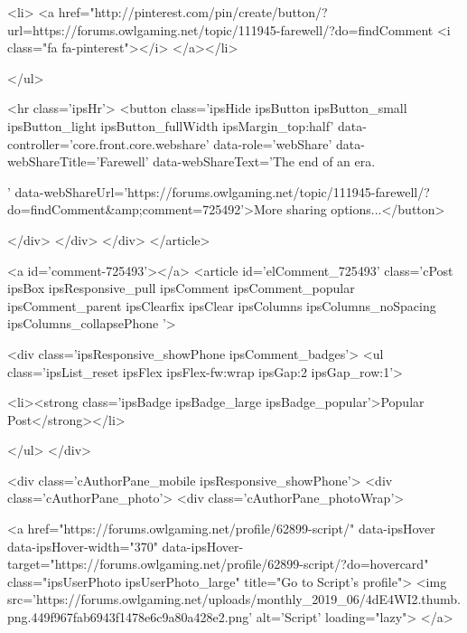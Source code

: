 			<li>
<a href="http://pinterest.com/pin/create/button/?url=https://forums.owlgaming.net/topic/111945-farewell/?do=findComment%
	<i class="fa fa-pinterest"></i>
</a></li>
		
	</ul>


	<hr class='ipsHr'>
	<button class='ipsHide ipsButton ipsButton_small ipsButton_light ipsButton_fullWidth ipsMargin_top:half' data-controller='core.front.core.webshare' data-role='webShare' data-webShareTitle='Farewell' data-webShareText='The end of an era. 
 
' data-webShareUrl='https://forums.owlgaming.net/topic/111945-farewell/?do=findComment&amp;comment=725492'>More sharing options...</button>

	
</div>
</div>
	</div>
</article>
					
				
					
					
					



<a id='comment-725493'></a>
<article  id='elComment_725493' class='cPost ipsBox ipsResponsive_pull  ipsComment ipsComment_popular ipsComment_parent ipsClearfix ipsClear ipsColumns ipsColumns_noSpacing ipsColumns_collapsePhone    '>
	

	
		<div class='ipsResponsive_showPhone ipsComment_badges'>
			<ul class='ipsList_reset ipsFlex ipsFlex-fw:wrap ipsGap:2 ipsGap_row:1'>
				
				
				
				
					<li><strong class='ipsBadge ipsBadge_large ipsBadge_popular'>Popular Post</strong></li>
				
			</ul>
		</div>
	

	<div class='cAuthorPane_mobile ipsResponsive_showPhone'>
		<div class='cAuthorPane_photo'>
			<div class='cAuthorPane_photoWrap'>
				


	<a href="https://forums.owlgaming.net/profile/62899-script/" data-ipsHover data-ipsHover-width="370" data-ipsHover-target="https://forums.owlgaming.net/profile/62899-script/?do=hovercard" class="ipsUserPhoto ipsUserPhoto_large" title="Go to Script's profile">
		<img src='https://forums.owlgaming.net/uploads/monthly_2019_06/4dE4WI2.thumb.png.449f967fab6943f1478e6c9a80a428e2.png' alt='Script' loading="lazy">
	</a>

